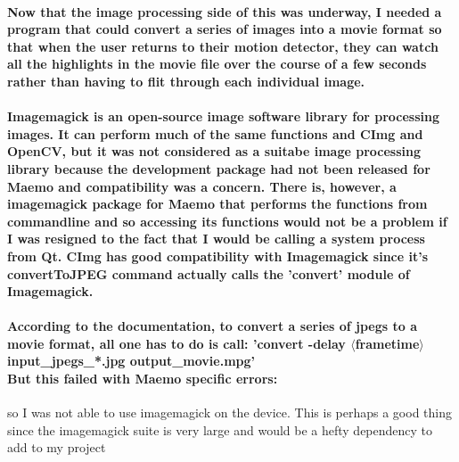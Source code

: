\paragraph{Now that the image processing side of this was underway, I needed a program that could convert a series of images into a movie format so that when the user returns to their motion detector, they can watch all the highlights in the movie file over the course of a few seconds rather than having to flit through each individual image.
}
\paragraph{{\bf Imagemagick} is an open-source image software library for processing images. It can perform much of the same functions and CImg and OpenCV, but it was not considered as a suitabe image processing library because the development package had not been released for Maemo and compatibility was a concern. There is, however, a imagemagick package for Maemo that performs the functions from commandline and so accessing its functions would not be a problem if I was resigned to the fact that I would be calling a system process from Qt. CImg has good compatibility with Imagemagick since it's convertToJPEG command actually calls the 'convert' module of Imagemagick.}
\paragraph{
According to the documentation, to convert a series of jpegs to a movie format, all one has to do is call:
'convert -delay \(\langle\)frametime\(\rangle\) input\_jpegs\_*.jpg output\_movie.mpg'\\
But this failed with Maemo specific errors:\\}
\vspace{-20pt}
\begin{frame}[fragile]

\end{frame}
so I was not able to use imagemagick on the device. This is perhaps a good thing since the imagemagick suite is very large and would be a hefty dependency to add to my project

